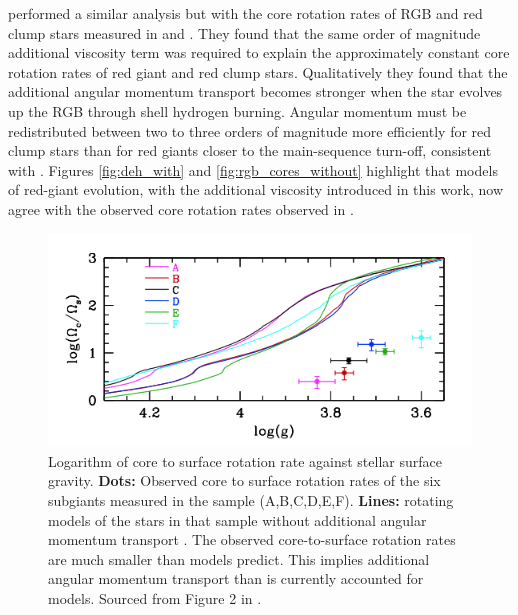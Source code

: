 \citet{moyano_asteroseismology_2022} performed a similar analysis but with the core rotation rates of RGB and red clump stars measured in \citet{mosser_spin_2012} and \citet{gehan_core_2018}.
They found that the same order of magnitude additional viscosity term was required to explain the approximately constant core rotation rates of red giant and red clump stars.  
Qualitatively they found that the additional angular momentum transport becomes stronger when the star evolves up the RGB through shell hydrogen burning.
Angular momentum must be redistributed between two to three orders of
magnitude more efficiently for red clump stars than for red giants closer to the main-sequence turn-off, consistent with \citet{den_hartogh_constraining_2019}.
Figures \ref{fig:deh_with} and \ref{fig:rgb_cores_without}  highlight that models of red-giant evolution, with the additional viscosity introduced in this work, now agree with the observed core rotation rates observed in \citet{gehan_core_2018}.

\begin{figure}[h]
    \includegraphics[width=\textwidth]{Figures/intro_figures/deheuvels_disparity_without.png}
    \caption[A comparison of modelled and observed core to surface rotation rate ratios of post-main-sequence stars without additional angular momentum transport.]{Logarithm of core to surface rotation rate against stellar surface gravity. 
    \textbf{Dots:} Observed core to surface rotation rates of the six subgiants measured in the \citet{deheuvels_seismic_2014} sample (A,B,C,D,E,F).
    \textbf{Lines:} rotating models of the stars in that sample without additional angular momentum transport \citep{eggenberger_asteroseismology_2019}.
    The observed core-to-surface rotation rates are much smaller than models predict. This implies additional angular momentum transport than is currently accounted for models.
    Sourced from Figure 2 in \citet{eggenberger_asteroseismology_2019}.}
    \label{fig:deh_without}
\end{figure}

